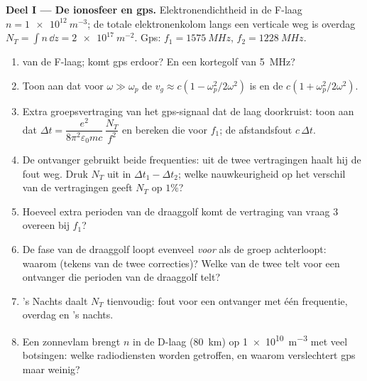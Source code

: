 \begin{problem}
\label{pb:b2:waves-in-media:1}

\medskip
\noindent\textbf{Deel I --- De ionosfeer en gps.}
Elektronendichtheid in de F-laag $n = \qty{1e12}{m^{-3}}$; de totale
elektronenkolom langs een verticale weg is overdag
$N_T = \int n\,\dd z = \qty{2e17}{m^{-2}}$. Gps: $f_1 = \qty{1575}{MHz}$,
$f_2 = \qty{1228}{MHz}$.
\begin{enumerate}
  \item {} van de F-laag; komt gps erdoor? En een kortegolf
        van \qty{5}{MHz}?
  \item Toon aan dat voor $\omega \gg \omega_p$ de 
        $v_g \approx c(1 -
        \omega_p^2/2\omega^2)$ is en de 
        $c(1 + \omega_p^2/2\omega^2)$.
  \item Extra groepsvertraging van het gps-signaal dat de laag doorkruist:
        toon aan dat
        $\Delta t = \dfrac{e^2}{8\pi^2\varepsilon_0mc}\,\dfrac{N_T}{f^2}$ en
        bereken die voor $f_1$; de afstandsfout $c\,\Delta t$.
  \item De ontvanger gebruikt beide frequenties: uit de twee vertragingen
        haalt hij de fout weg. Druk $N_T$ uit in $\Delta t_1 - \Delta t_2$;
        welke nauwkeurigheid op het verschil van de vertragingen geeft $N_T$
        op $1\%$?
  \item Hoeveel extra perioden van de draaggolf komt de vertraging van vraag
        3 overeen bij $f_1$?
  \item De fase van de draaggolf loopt evenveel \emph{voor} als de groep
        achterloopt: waarom (tekens van de twee correcties)? Welke van de
        twee telt voor een ontvanger die perioden van de draaggolf telt?
  \item 's Nachts daalt $N_T$ tienvoudig: fout voor een ontvanger met één
        frequentie, overdag en 's nachts.
  \item Een zonnevlam brengt $n$ in de D-laag (\qty{80}{km}) op
        \qty{1e10}{m^{-3}} met veel botsingen: welke radiodiensten worden
        getroffen, en waarom verslechtert gps maar weinig?
\end{enumerate}


\end{problem}
